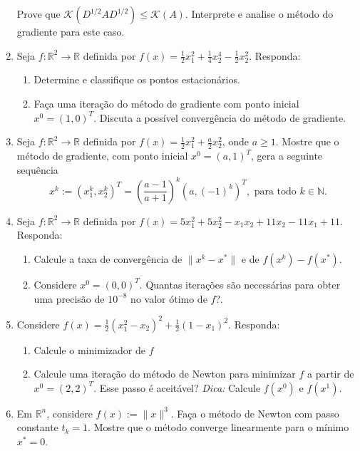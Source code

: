 \documentclass[a4paper,latin]{article}
\begin{document}
\begin{enumerate}
    Prove que $\mathcal{K}(D^{1/2}AD^{1/2})\leq \mathcal{K}(A)$. 
    Interprete e analise o método do gradiente para este caso.   
    \item Seja $f:\mathbb{R}^{2}\rightarrow \mathbb{R}$ definida por
    $ f(x)=\frac{1}{2}x_1^{2}+\frac{1}{4}x_2^{4}-\frac{1}{2}x_2^{2}$.
    Responda:
        \begin{enumerate}
        \item Determine e classifique os pontos estacionários.
        \item Faça uma iteração do método de 
        gradiente com ponto inicial $x^{0}=(1,0)^{T}$. 
        Discuta a possível convergência do método de gradiente. 
        \end{enumerate}
     \item Seja $f:\mathbb{R}^{2}\rightarrow \mathbb{R}$ definida por
  $f(x)=\frac{1}{2}x_1^{2}+\frac{a}{2}x_2^{2}$, onde $a\geq 1$.
     Mostre que o método de gradiente, com ponto inicial $x^{0}=(a,1)^{T}$, gera 
     a seguinte sequência 
     $$ x^{k}:=(x_1^k,x_2^k)^{T}=
     \left(\frac{a-1}{a+1}\right)^{k}
     (a, (-1)^{k})^{T}, \text{ para todo }
     k \in \mathbb{N}.$$         
     \item Seja $f:\mathbb{R}^{2}\rightarrow \mathbb{R}$ definida por
    $ f(x)=5x_1^{2}+5x_2^{2}-x_1x_2+11x_2-11x_1+11$.
    Responda:
        \begin{enumerate}
        \item Calcule a taxa de convergência de $\|x^k-x^*\|$ 
        e de $f(x^k)-f(x^*)$.
        \item Considere $x^{0}=(0,0)^{T}$. 
        Quantas iterações são necessárias para 
        obter uma precisão de $10^{-8}$ no valor ótimo de $f$?. 
        \end{enumerate}    
     \item Considere    
     $ f(x)=\frac{1}{2}(x_1^{2}-x_2)^{2}+\frac{1}{2}(1-x_1)^2$.
    Responda:
        \begin{enumerate}
        \item Calcule o minimizador de $f$
        \item Calcule uma iteração do método de Newton 
        para minimizar $f$ a partir de $x^{0}=(2,2)^{T}$. 
        Esse passo é aceitável?
        {\it Dica:} Calcule $f(x^0)$ e $f(x^1)$. 
        \end{enumerate}        
    \item Em $\mathbb{R}^{n}$, considere
    $f(x):=\|x\|^{3}$. Faça o método de Newton com passo constante $t_{k}=1$.
    Mostre que o método converge linearmente para o mínimo $x^{*}=0$.

\end{enumerate}
\end{document}
